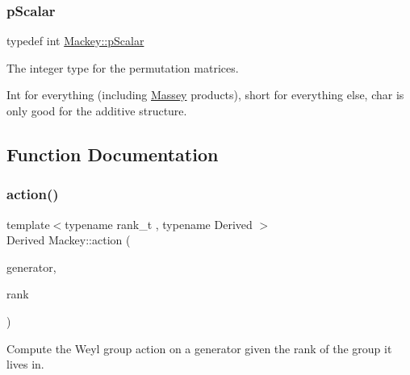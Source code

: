 \subsubsection{\texorpdfstring{p\+Scalar}{pScalar}}
{\footnotesize\ttfamily typedef int \hyperlink{namespaceMackey_a4f147e328c520f568f5d3adf1c75f514}{Mackey\+::p\+Scalar}}

The integer type for the permutation matrices.

Int for everything (including \hyperlink{classMackey_1_1Massey}{Massey} products), short for everything else, char is only good for the additive structure. 

\subsection{Function Documentation}
\mbox{\label{namespaceMackey_aa515b26c0fbc7f19b36cee7d826f07b9}} 
\subsubsection{\texorpdfstring{action()}{action()}\hspace{0.1cm}{\footnotesize\ttfamily [1/2]}}
{\footnotesize\ttfamily template$<$typename rank\+\_\+t , typename Derived $>$ \\
Derived Mackey\+::action (\begin{DoxyParamCaption}\item[{const Eigen\+::\+Matrix\+Base$<$ Derived $>$ \&}]{generator,  }\item[{const rank\+\_\+t \&}]{rank }\end{DoxyParamCaption})}



Compute the Weyl group action on a generator given the rank of the group it lives in. 

